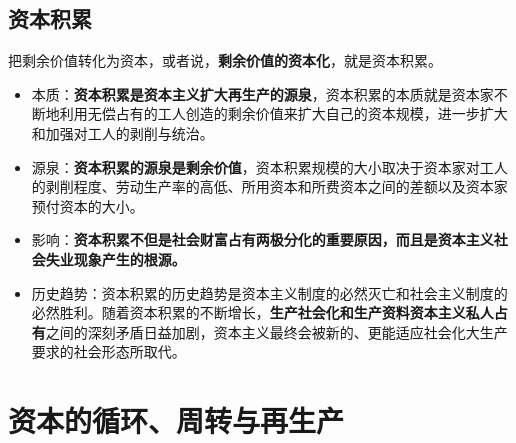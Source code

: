 \documentclass[12pt,openany]{ctexbook}
\begin{document}
\subsection{资本积累}
\begin{mdquote}
把剩余价值转化为资本，或者说，\textbf{剩余价值的资本化}，就是资本积累。
\end{mdquote}
\begin{itemize}
  \item 本质：\textbf{资本积累是资本主义扩大再生产的源泉}，资本积累的本质就是资本家不断地利用无偿占有的工人创造的剩余价值来扩大自己的资本规模，进一步扩大和加强对工人的剥削与统治。
  \item 源泉：\textbf{资本积累的源泉是剩余价值}，资本积累规模的大小取决于资本家对工人的剥削程度、劳动生产率的高低、所用资本和所费资本之间的差额以及资本家预付资本的大小。
  \item 影响：\textbf{资本积累不但是社会财富占有两极分化的重要原因，而且是资本主义社会失业现象产生的根源。}
  \item 历史趋势：资本积累的历史趋势是资本主义制度的必然灭亡和社会主义制度的必然胜利。随着资本积累的不断增长，\textbf{生产社会化和生产资料资本主义私人占有}之间的深刻矛盾日益加剧，资本主义最终会被新的、更能适应社会化大生产要求的社会形态所取代。
\end{itemize}
\section{资本的循环、周转与再生产}
\end{document}
